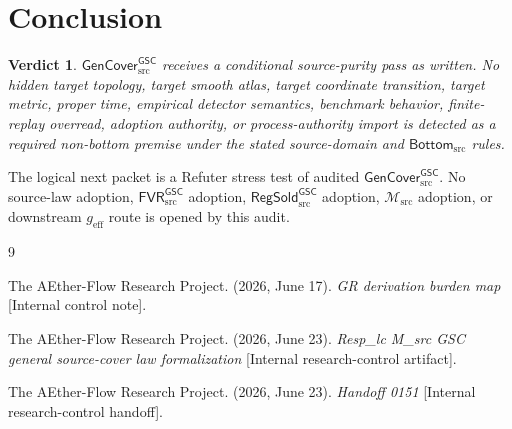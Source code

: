 \documentclass[11pt]{article}
\newcommand{\Msrc}{\mathcal{M}_{\mathrm{src}}}
\newcommand{\geff}{g_{\mathrm{eff}}}
\newcommand{\RegSold}{\mathsf{RegSold}_{\mathrm{src}}^{\mathsf{GSC}}}
\newcommand{\FVRSrc}{\mathsf{FVR}_{\mathrm{src}}^{\mathsf{GSC}}}
\newcommand{\GenCover}{\mathsf{GenCover}_{\mathrm{src}}^{\mathsf{GSC}}}
\newcommand{\BottomSrc}{\mathsf{Bottom}_{\mathrm{src}}}
\newtheorem{verdict}{Verdict}
\begin{document}
\section{Conclusion}

\begin{verdict}
\(\GenCover\) receives a conditional source-purity pass as written. No hidden
target topology, target smooth atlas, target coordinate transition, target
metric, proper time, empirical detector semantics, benchmark behavior,
finite-replay overread, adoption authority, or process-authority import is
detected as a required non-bottom premise under the stated source-domain and
\(\BottomSrc\) rules.
\end{verdict}

The logical next packet is a Refuter stress test of audited \(\GenCover\).
No source-law adoption, \(\FVRSrc\) adoption, \(\RegSold\) adoption,
\(\Msrc\) adoption, or downstream \(\geff\) route is opened by this audit.

\begin{thebibliography}{9}

The AEther-Flow Research Project. (2026, June 17). \emph{GR derivation burden
map} [Internal control note].

The AEther-Flow Research Project. (2026, June 23). \emph{Resp\_lc M\_src GSC
general source-cover law formalization} [Internal research-control artifact].

The AEther-Flow Research Project. (2026, June 23). \emph{Handoff 0151}
[Internal research-control handoff].

\end{thebibliography}
\end{document}
